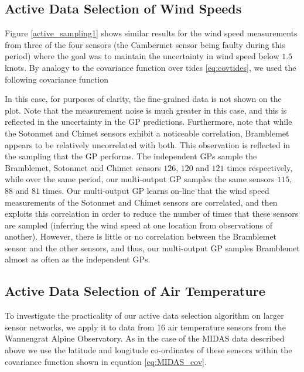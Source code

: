 \documentclass{acmtrans2m}
\begin{document}
\subsection{Active Data Selection of Wind Speeds}

Figure \ref{active_sampling1} shows similar results for the wind speed measurements from three of the four sensors (the Cambermet sensor being faulty during this period) where the goal was to maintain the uncertainty in wind speed below $1.5$ knots. By analogy to the covariance function over tides \eqref{eq:covtides}, we used the following covariance function

In this case, for purposes of clarity, the fine-grained data is not shown on the plot. Note that the measurement noise is much greater in this case, and this is reflected in the uncertainty in the GP predictions. Furthermore, note that while the Sotonmet and Chimet sensors exhibit a noticeable correlation, Bramblemet appears to be relatively uncorrelated with both. This observation is reflected in the sampling that the GP performs. The independent GPs sample the Bramblemet, Sotonmet and Chimet sensors $126$, $120$ and $121$ times respectively, while over the same period, our multi-output GP samples the same sensors $115$, $88$ and $81$ times. Our multi-output GP learns on-line that the wind speed measurements of the Sotonmet and Chimet sensors are correlated, and then exploits this correlation in order to reduce the number of times that these sensors are sampled (inferring the wind speed at one location from observations of another). However, there is little or no correlation between the Bramblemet sensor and the other sensors, and thus, our multi-output GP samples Bramblemet almost as often as the independent GPs.


\subsection{Active Data Selection of Air Temperature}

To investigate the practicality of our active data selection algorithm on larger sensor networks, we apply it to data from 16 air temperature sensors from the Wannengrat Alpine Observatory. As in the case of the MIDAS data described above we use the latitude and longitude co-ordinates of these sensors within the covariance function shown in equation \eqref{eq:MIDAS_cov}.
\end{document}
